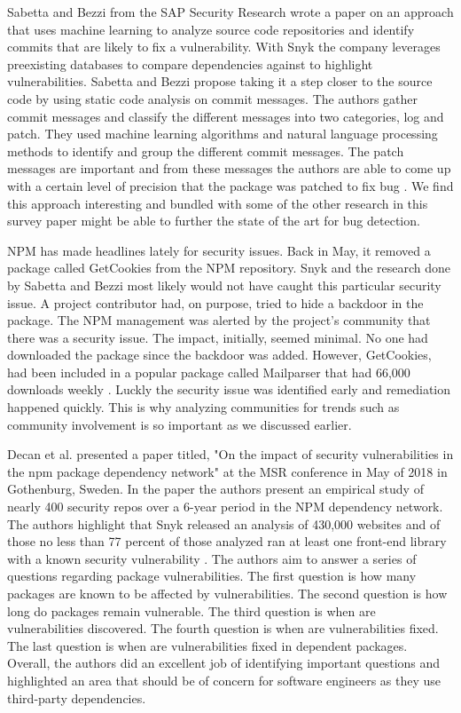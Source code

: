 \documentclass[journal]{IEEEtran}
\begin{document}
Sabetta and Bezzi from the SAP Security Research wrote a paper on an approach that uses machine learning to analyze source code repositories and identify commits that are likely to fix a vulnerability. With Snyk the company leverages preexisting databases to compare dependencies against to highlight vulnerabilities. Sabetta and Bezzi propose taking it a step closer to the source code by using static code analysis on commit messages. The authors gather commit messages and classify the different messages into two categories, log and patch. They used machine learning algorithms and natural language processing methods to identify and group the different commit messages. The patch messages are important and from these messages the authors are able to come up with a certain level of precision that the package was patched to fix bug \cite{Sabetta_Bezzi_2018}. We find this approach interesting and bundled with some of the other research in this survey paper might be able to further the state of the art for bug detection. 

NPM has made headlines lately for security issues. Back in May, it removed a package called GetCookies from the NPM repository. Snyk and the research done by Sabetta and Bezzi most likely would not have caught this particular security issue. A project contributor had, on purpose, tried to hide a backdoor in the package. The NPM management was alerted by the project's community that there was a security issue. The impact, initially, seemed minimal. No one had downloaded the package since the backdoor was added. However, GetCookies, had been included in a popular package called Mailparser that had 66,000 downloads weekly \cite{Somebody}. Luckly the security issue was identified early and remediation happened quickly. This is why analyzing communities for trends such as community involvement is so important as we discussed earlier. 

Decan et al. presented a paper titled, "On the impact of security vulnerabilities in the npm package dependency network" at the MSR conference in May of 2018 in Gothenburg, Sweden. In the paper the authors present an empirical study of nearly 400 security repos over a 6-year period in the NPM dependency network. The authors highlight that Snyk released an analysis of 430,000 websites and of those no less than 77 percent of those analyzed ran at least one front-end library with a known security vulnerability \cite{decan2018impact}.  The authors aim to answer a series of questions regarding package vulnerabilities. The first question is how many packages are known to be affected by vulnerabilities. The second question is how long do packages remain vulnerable. The third question is when are vulnerabilities discovered. The fourth question is when are vulnerabilities fixed. The last question is when are vulnerabilities fixed in dependent packages. Overall, the authors did an excellent job of identifying important questions and highlighted an area that should be of concern for software engineers as they use third-party dependencies. 
\end{document}

